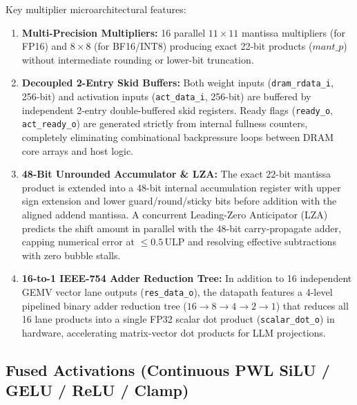 \documentclass[journal,10pt,twocolumn]{IEEEtran}
\begin{document}
Key multiplier microarchitectural features:
\begin{enumerate}
  \item \textbf{Multi-Precision Multipliers:} 16 parallel $11 \times 11$ mantissa multipliers (for FP16) and $8 \times 8$ (for BF16/INT8) producing exact 22-bit products ($mant\_p$) without intermediate rounding or lower-bit truncation.
  \item \textbf{Decoupled 2-Entry Skid Buffers:} Both weight inputs (\texttt{dram\_rdata\_i}, 256-bit) and activation inputs (\texttt{act\_data\_i}, 256-bit) are buffered by independent 2-entry double-buffered skid registers. Ready flags (\texttt{ready\_o}, \texttt{act\_ready\_o}) are generated strictly from internal fullness counters, completely eliminating combinational backpressure loops between DRAM core arrays and host logic.
  \item \textbf{48-Bit Unrounded Accumulator \& LZA:} The exact 22-bit mantissa product is extended into a 48-bit internal accumulation register with upper sign extension and lower guard/round/sticky bits before addition with the aligned addend mantissa. A concurrent Leading-Zero Anticipator (LZA) predicts the shift amount in parallel with the 48-bit carry-propagate adder, capping numerical error at $\le 0.5\,\text{ULP}$ and resolving effective subtractions with zero bubble stalls.
  \item \textbf{16-to-1 IEEE-754 Adder Reduction Tree:} In addition to 16 independent GEMV vector lane outputs (\texttt{res\_data\_o}), the datapath features a 4-level pipelined binary adder reduction tree ($16 \rightarrow 8 \rightarrow 4 \rightarrow 2 \rightarrow 1$) that reduces all 16 lane products into a single FP32 scalar dot product (\texttt{scalar\_dot\_o}) in hardware, accelerating matrix-vector dot products for LLM projections.
\end{enumerate}

\subsection{Fused Activations (Continuous PWL SiLU / GELU / ReLU / Clamp)}
\end{document}
